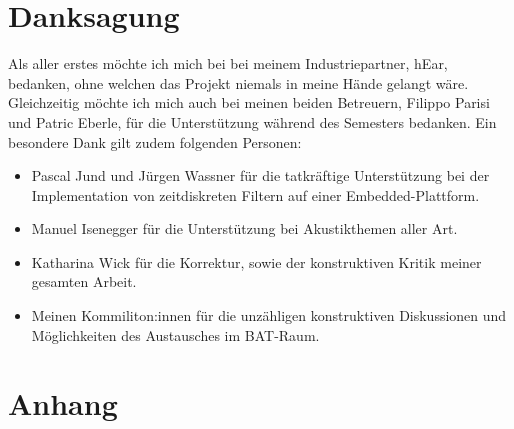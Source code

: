 \documentclass[12pt]{article}
\begin{document}
	\newpage
	\section*{Danksagung}
	Als aller erstes möchte ich mich bei bei meinem Industriepartner, hEar, bedanken, ohne welchen das Projekt niemals in meine Hände gelangt wäre. Gleichzeitig möchte ich mich auch bei meinen beiden Betreuern, Filippo Parisi und Patric Eberle, für die Unterstützung während des Semesters bedanken. Ein besondere Dank gilt zudem folgenden Personen:
	\begin{itemize}
		\item Pascal Jund und Jürgen Wassner für die tatkräftige Unterstützung bei der Implementation von zeitdiskreten Filtern auf einer Embedded-Plattform.
		\item Manuel Isenegger für die Unterstützung bei Akustikthemen aller Art.
		\item Katharina Wick für die Korrektur, sowie der konstruktiven Kritik meiner gesamten Arbeit.
		\item Meinen Kommiliton:innen für die unzähligen konstruktiven Diskussionen und Möglichkeiten des Austausches im BAT-Raum. 
	\end{itemize}
	
	\newpage
	\section{Anhang}
	
	
	
	\newpage
	\listoffigures
	
	\newpage
	
\end{document}
